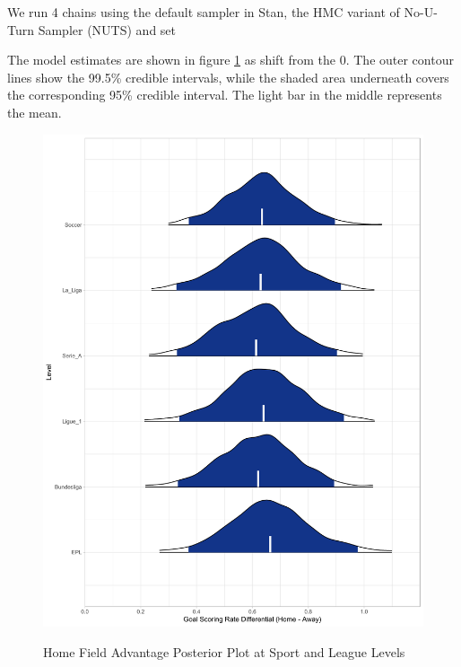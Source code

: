 \documentclass[USenglish]{article}
\begin{document}
We run 4 chains using the default sampler in Stan, the HMC variant of No-U-Turn Sampler (NUTS) \citep{Hoffman2014} and set  

The model estimates are shown in figure \ref{fig31} as shift from the 0. The outer contour lines show the 99.5\% credible intervals, while the shaded area underneath covers the corresponding 95\% credible interval. The light bar in the middle represents the mean.

\begin{figure}
\caption{Home Field Advantage Posterior Plot at Sport and League Levels}
{\includegraphics[width=0.80\linewidth]{HFA32.pdf}}
\label{fig31}
\end{figure}
\end{document}
